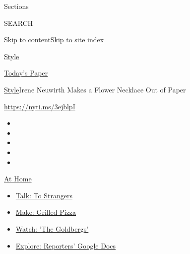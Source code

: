 Sections

SEARCH

\protect\hyperlink{site-content}{Skip to
content}\protect\hyperlink{site-index}{Skip to site index}

\href{https://www.nytimes3xbfgragh.onion/section/style}{Style}

\href{https://myaccount.nytimes3xbfgragh.onion/auth/login?response_type=cookie\&client_id=vi}{}

\href{https://www.nytimes3xbfgragh.onion/section/todayspaper}{Today's
Paper}

\href{/section/style}{Style}\textbar{}Irene Neuwirth Makes a Flower
Necklace Out of Paper

\url{https://nyti.ms/3ejblpI}

\begin{itemize}
\item
\item
\item
\item
\item
\end{itemize}

\href{https://www.nytimes3xbfgragh.onion/spotlight/at-home?action=click\&pgtype=Article\&state=default\&region=TOP_BANNER\&context=at_home_menu}{At
Home}

\begin{itemize}
\tightlist
\item
  \href{https://www.nytimes3xbfgragh.onion/2020/08/03/well/family/the-benefits-of-talking-to-strangers.html?action=click\&pgtype=Article\&state=default\&region=TOP_BANNER\&context=at_home_menu}{Talk:
  To Strangers}
\item
  \href{https://www.nytimes3xbfgragh.onion/2020/08/01/at-home/coronavirus-make-pizza-on-a-grill.html?action=click\&pgtype=Article\&state=default\&region=TOP_BANNER\&context=at_home_menu}{Make:
  Grilled Pizza}
\item
  \href{https://www.nytimes3xbfgragh.onion/2020/07/31/arts/television/goldbergs-abc-stream.html?action=click\&pgtype=Article\&state=default\&region=TOP_BANNER\&context=at_home_menu}{Watch:
  'The Goldbergs'}
\item
  \href{https://www.nytimes3xbfgragh.onion/interactive/2020/at-home/even-more-reporters-editors-diaries-lists-recommendations.html?action=click\&pgtype=Article\&state=default\&region=TOP_BANNER\&context=at_home_menu}{Explore:
  Reporters' Google Docs}
\end{itemize}

